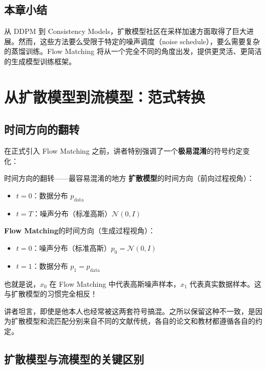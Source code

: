 \documentclass[a4paper]{article}
\begin{document}
\subsection{本章小结}

从 DDPM 到 Consistency Models，扩散模型社区在采样加速方面取得了巨大进展。然而，这些方法要么受限于特定的噪声调度（noise schedule），要么需要复杂的蒸馏训练。Flow Matching 将从一个完全不同的角度出发，提供更灵活、更简洁的生成模型训练框架。

\section{从扩散模型到流模型：范式转换}

\subsection{时间方向的翻转}

在正式引入 Flow Matching 之前，讲者特别强调了一个\textbf{极易混淆}的符号约定变化：

\begin{warningbox}{时间方向的翻转——最容易混淆的地方}
\textbf{扩散模型}的时间方向（前向过程视角）：
\begin{itemize}
    \item $t = 0$：数据分布 $p_{\text{data}}$
    \item $t = T$：噪声分布（标准高斯）$\mathcal{N}(0, I)$
\end{itemize}

\textbf{Flow Matching}的时间方向（生成过程视角）：
\begin{itemize}
    \item $t = 0$：噪声分布（标准高斯）$p_0 = \mathcal{N}(0, I)$
    \item $t = 1$：数据分布 $p_1 = p_{\text{data}}$
\end{itemize}

也就是说，$x_0$ 在 Flow Matching 中代表高斯噪声样本，$x_1$ 代表真实数据样本。这与扩散模型的习惯完全相反！
\end{warningbox}

讲者坦言，即使是他本人也经常被这两套符号搞混。之所以保留这种不一致，是因为扩散模型和流匹配分别来自不同的文献传统，各自的论文和教材都遵循各自的约定。

\subsection{扩散模型与流模型的关键区别}
\end{document}
